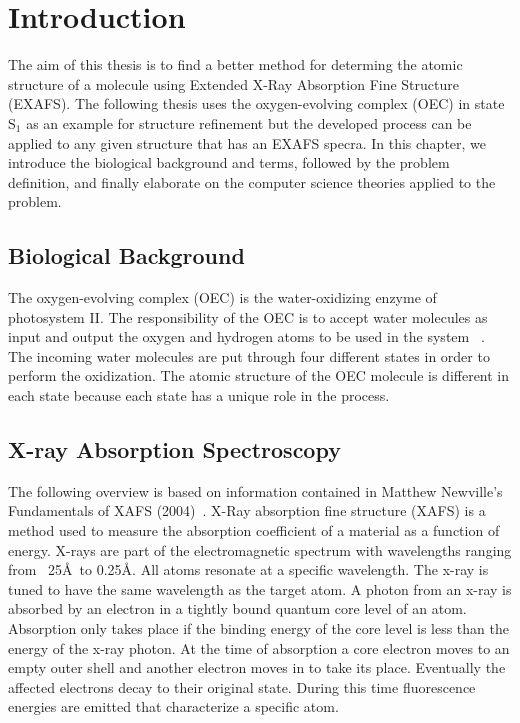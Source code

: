 \chapter{Introduction}

The aim of this thesis is to find a better method for determing the atomic structure of a molecule using Extended X-Ray Absorption Fine Structure (EXAFS). The following thesis uses the oxygen-evolving complex (OEC) in state S$_{1}$ as an example for structure refinement but the developed process can be applied to any given structure that has an EXAFS specra. In this chapter, we introduce the biological background and terms, followed by the problem definition, and finally elaborate on the computer science theories applied to the problem.

\section{Biological Background}

The oxygen-evolving complex (OEC) is the water-oxidizing enzyme of photosystem II. The responsibility of the OEC is to accept water molecules as input and output the oxygen and hydrogen atoms to be used in the system ~\cite{oxygenicPhotosynthesis}. The incoming water molecules are put through four different states in order to perform the oxidization. The atomic structure of the OEC molecule is different in each state because each state has a unique role in the process.

\section{X-ray Absorption Spectroscopy}

The following overview is based on information contained in Matthew Newville’s Fundamentals of XAFS (2004)~\cite{newville2004fundamentals}. X-Ray absorption fine structure (XAFS) is a method used to measure the absorption coefficient of a material as a function of energy. X-rays are part of the electromagnetic spectrum with wavelengths ranging from ~25\AA\ to 0.25\AA. All atoms resonate at a specific wavelength. The x-ray is tuned to have the same wavelength as the target atom. A photon from an x-ray is absorbed by an electron in a tightly bound quantum core level of an atom. Absorption only takes place if the binding energy of the core level is less than the energy of the x-ray photon. At the time of absorption a core electron moves to an empty outer shell and another electron moves in to take its place. Eventually the affected electrons decay to their original state. During this time fluorescence energies are emitted that characterize a specific atom.

